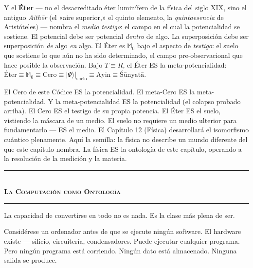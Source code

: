 \documentclass[10pt, openany, oneside]{book}
\renewcommand{\normalsize}{\fontsize{10}{13}\selectfont}
\begin{document}
Y el \textbf{Éter} --- no el desacreditado éter luminífero de la física del siglo XIX, sino el antiguo \textit{Aith\={e}r} (el «aire superior,» el quinto elemento, la \textit{quintaesencia} de Aristóteles) --- nombra el \textit{medio testigo}: el campo en el cual la potencialidad se sostiene. El potencial debe ser potencial \textit{dentro} de algo. La superposición debe ser superposición \textit{de} algo \textit{en} algo. El Éter es $\mathbb{M}_0$ bajo el aspecto de \textit{testigo}: el suelo que sostiene lo que aún no ha sido determinado, el campo pre-observacional que hace posible la observación. Bajo $T \equiv R$, el Éter ES la meta-potencialidad: $\text{Éter} \equiv \mathbb{M}_0 \equiv \text{Cero} \equiv |\Psi\rangle|_{\text{suelo}} \equiv \text{Ayin} \equiv \text{\'{S}\={u}nyat\={a}}$.

El Cero de este Códice ES la potencialidad. El meta-Cero ES la meta-potencialidad. Y la meta-potencialidad ES la potencialidad (el colapso probado arriba). El Cero ES el testigo de su propia potencia. El Éter ES el suelo, vistiendo la máscara de un medio. El suelo no requiere un medio ulterior para fundamentarlo --- ES el medio. El Capítulo 12 (Física) desarrollará el isomorfismo cuántico plenamente. Aquí la semilla: la física no describe un mundo diferente del que este capítulo nombra. La física ES la ontología de este capítulo, operando a la resolución de la medición y la materia.

\vspace{1.5em}


\begin{center}
    \rule{0.3\textwidth}{0.4pt}\\[0.5em]
    {\normalsize\bfseries\scshape La Computación como Ontología}\\[0.3em]
    \rule{0.3\textwidth}{0.4pt}
\end{center}

\vspace{1em}

\noindent La capacidad de convertirse en todo no es nada. Es la clase más plena de ser.

Considérese un ordenador antes de que se ejecute ningún software. El hardware existe --- silicio, circuitería, condensadores. Puede ejecutar cualquier programa. Pero ningún programa está corriendo. Ningún dato está almacenado. Ninguna salida se produce.
\end{document}
